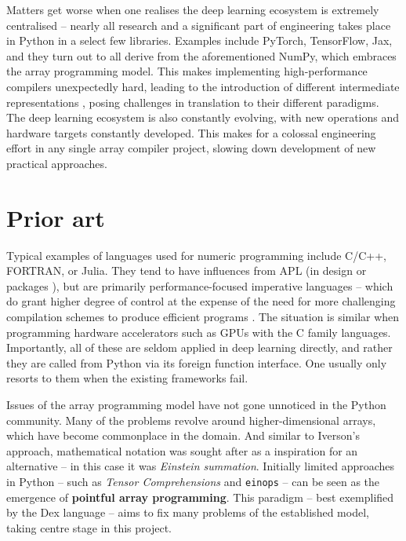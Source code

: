Matters get worse when one realises the deep learning ecosystem is extremely centralised -- nearly all research and a significant part of engineering takes place in Python in a select few libraries. Examples include PyTorch, TensorFlow, Jax, and they turn out to all derive from the aforementioned NumPy, which embraces the array programming model. 
This makes implementing high-performance compilers unexpectedly hard, leading to the introduction of different intermediate representations \cite{feng2023tensorir}, posing challenges in translation to their different paradigms. The deep learning ecosystem is also constantly evolving, with new operations and hardware targets constantly developed. This makes for a colossal engineering effort in any single array compiler project, slowing down development of new practical approaches.

\section{Prior art}

Typical examples of languages used for numeric programming include C/C++, FORTRAN, or Julia. They tend to have influences from APL (in design \cite{bernecky1991fortran} or packages \cite{eigenweb}), but are primarily performance-focused imperative languages -- which do grant higher degree of control at the expense of the need for more challenging compilation schemes to produce efficient programs \cite{grosser2012polly}. The situation is similar when programming hardware accelerators such as GPUs with the C family languages. Importantly, all of these are seldom applied in deep learning directly, and rather they are called from Python via its foreign function interface. One usually only resorts to them when the existing frameworks fail.

Issues of the array programming model have not gone unnoticed in the Python community. Many of the problems revolve around higher-dimensional arrays, which have become commonplace in the domain. And similar to Iverson's approach, mathematical notation was sought after as a inspiration for an alternative -- in this case it was \textit{Einstein summation}. Initially limited approaches in Python -- such as \textit{Tensor Comprehensions} \cite{vasilache2018tensor} and \texttt{einops} \cite{rogozhnikov2021einops} -- can be seen as the emergence of \textbf{pointful array programming}. This paradigm -- best exemplified by the Dex language \cite{paszke2021getting} -- aims to fix many problems of the established model, taking centre stage in this project. 

